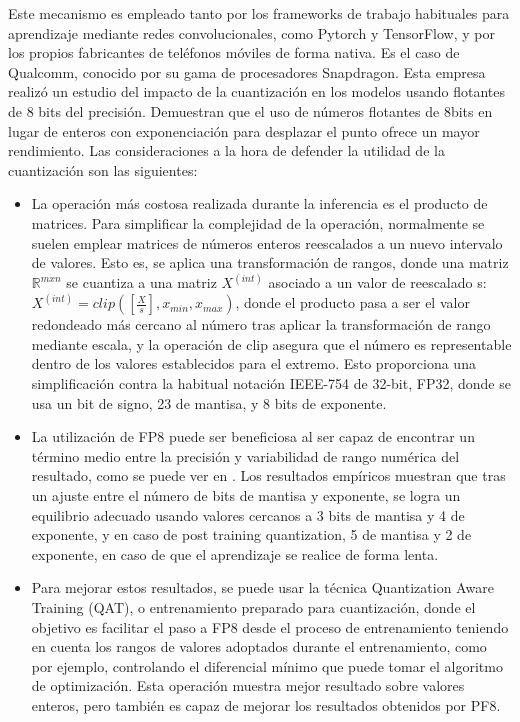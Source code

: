 Este mecanismo es empleado tanto por los frameworks de trabajo habituales para aprendizaje mediante redes convolucionales, como Pytorch y TensorFlow, y por los propios fabricantes de teléfonos móviles de forma nativa. Es el caso de Qualcomm, conocido por su gama de procesadores Snapdragon. Esta empresa realizó un estudio del impacto de la cuantización en los modelos \cite{kuzmin2024fp8} usando flotantes de 8 bits del precisión. Demuestran que el uso de números flotantes de 8bits en lugar de enteros con exponenciación para desplazar el punto ofrece un mayor rendimiento. Las consideraciones a la hora de defender la utilidad de la cuantización son las siguientes:

\begin{itemize}
	\item La operación más costosa realizada durante la inferencia es el producto de matrices. Para simplificar la complejidad de la operación, normalmente se suelen emplear matrices de números enteros reescalados a un nuevo intervalo de valores. Esto es, se aplica una transformación de rangos, donde una matriz $\mathbb{R}^{m x n}$ se cuantiza a una matriz $X^{(int)}$ asociado a un valor de reescalado s: $X^{(int)}=clip([\frac{X}{s}],x_{min},x_{max})$, donde el producto pasa a ser el valor redondeado más cercano al número tras aplicar la transformación de rango mediante escala, y la operación de clip asegura que el número es representable dentro de los valores establecidos para el extremo. Esto proporciona una simplificación contra la habitual notación IEEE-754 de 32-bit, FP32, donde se usa un bit de signo, 23
	de mantisa, y 8 bits de exponente.
	\item  La utilización de FP8 puede ser beneficiosa al ser capaz de encontrar un término medio entre la precisión y variabilidad de rango numérica del resultado, como se puede ver en \cite{kuzmin2024fp8}. Los resultados empíricos muestran que tras un ajuste entre el número de bits de mantisa y exponente, se logra un equilibrio adecuado usando valores cercanos a 3 bits de mantisa y 4 de exponente, y en caso de post training quantization, 5 de mantisa y 2 de exponente, en caso de que el aprendizaje se realice de forma lenta.
	\item Para mejorar estos resultados, se puede usar la técnica Quantization Aware Training (QAT), o entrenamiento preparado para cuantización, donde el objetivo es facilitar el paso a FP8 desde el proceso de entrenamiento teniendo en cuenta los rangos de valores adoptados durante el entrenamiento, como por ejemplo, controlando el diferencial mínimo que puede tomar el algoritmo de optimización. Esta operación muestra mejor resultado sobre valores enteros, pero también es capaz de mejorar los resultados obtenidos por PF8.
\end{itemize}

